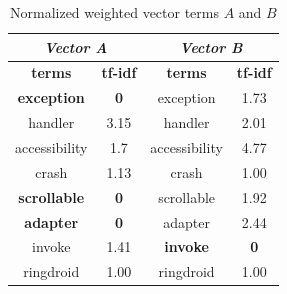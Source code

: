 \begin{table}[tb]
\centering
\caption{Normalized weighted vector terms $A$ and $B$}
\label{tbl: afternormal}
\begin{tabular}{|c|c|c|c|}
\hline
\multicolumn{2}{|c|}{{\color[HTML]{000000} \textit{\textbf{Vector A}}}} & \multicolumn{2}{c|}{{\color[HTML]{000000} \textit{\textbf{Vector B}}}} \\ \hline
\textbf{terms}                     & \textbf{tf-idf}                    & \textbf{terms}                    & \textbf{tf-idf}                    \\ \hline
\textbf{exception}                          & \textbf{0}                         & exception                         & 1.73                               \\ \hline
handler                            & 3.15                               & handler                           & 2.01                               \\ \hline
accessibility                      & 1.7                                & accessibility                     & 4.77                               \\ \hline
crash                              & 1.13                               & crash                             & 1.00                               \\ \hline
\textbf{scrollable}                         & \textbf{0}                         & scrollable                        & 1.92                               \\ \hline
\textbf{adapter}                            & \textbf{0}                         & adapter                           & 2.44                               \\ \hline
invoke                             & 1.41                               & \textbf{invoke}                            & \textbf{0}                         \\ \hline
ringdroid                          & 1.00                               & ringdroid                         & 1.00                               \\ \hline
\end{tabular}
\end{table}


